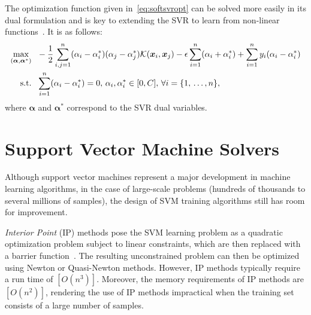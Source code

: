 \documentclass[reqno]{vcuthesis}
\newcommand{\set}[1]{{\left\{#1\right\}}}
\numberwithin{equation}{chapter}
\begin{document}
The optimization function given in~\ref{eq:softsvropt} can be solved more easily in its dual formulation and is key to extending the SVR to learn from non-linear functions~\cite{Schoelkopf2002}. It is as follows:
\begin{equation}
\label{eq:dualSVR}
\centering
\begin{aligned}
\max\limits_{(\bm \alpha, \bm \alpha^*)} & {\,\,\,\,} -\frac{1}{2} \sum_{i,j = 1}^n (\alpha_i - \alpha^*_i)(\alpha_j - \alpha^*_j)\mathcal{K}(\bm x_i, \bm x_j)  - \epsilon \sum_{i=1}^n (\alpha_i + \alpha^*_i) + \sum_{i=1}^n y_i (\alpha_i - \alpha^*_i) \\
 \text{s.t.} & {\,\,\,\,} \sum_{i=1}^n (\alpha_i - \alpha^*_i) = 0,\, \alpha_i, \alpha^*_i \in [0, C],\, \forall i = \set{1,\,\ldots,n},
 \end{aligned}
\end{equation}
where $\bm \alpha$ and $\bm \alpha^*$ correspond to the SVR dual variables.  

\section{Support Vector Machine Solvers}
Although support vector machines represent a major development in machine learning algorithms, in the case of large-scale problems (hundreds of thousands to several millions of samples), the design of SVM training algorithms still has room for improvement. 


\textit{Interior Point} (IP) methods pose the SVM learning problem as a quadratic optimization problem subject to linear constraints, which are then replaced with a barrier function~\cite{Boyd2004}. The resulting unconstrained problem can then be optimized using Newton or Quasi-Newton methods. However, IP methods typically require a run time of $[O(n^3)]$. Moreover, the memory requirements of IP methods are $[O(n^2)]$, rendering the use of IP methods impractical when the training set consists of a large number of samples. 
\end{document}
